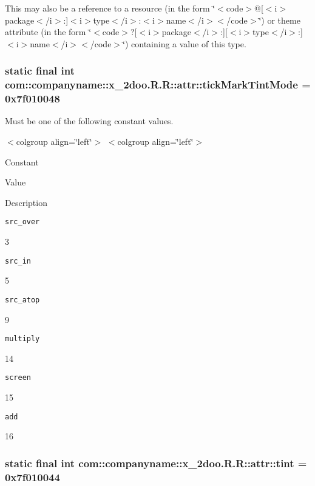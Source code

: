 This may also be a reference to a resource (in the form \char`\"{}$<$code$>$@\mbox{[}$<$i$>$package$<$/i$>$:\mbox{]}$<$i$>$type$<$/i$>$:$<$i$>$name$<$/i$>$$<$/code$>$\char`\"{}) or theme attribute (in the form \char`\"{}$<$code$>$?\mbox{[}$<$i$>$package$<$/i$>$:\mbox{]}\mbox{[}$<$i$>$type$<$/i$>$:\mbox{]}$<$i$>$name$<$/i$>$$<$/code$>$\char`\"{}) containing a value of this type. \hypertarget{classcom_1_1companyname_1_1x__2doo_1_1_r_1_1attr_dbe326d1dc87f4553866734cdb38566f}{
\subsubsection[{tickMarkTintMode}]{\setlength{\rightskip}{0pt plus 5cm}static final int com::companyname::x\_\-2doo.R.R::attr::tickMarkTintMode = 0x7f010048}}
\label{classcom_1_1companyname_1_1x__2doo_1_1_r_1_1attr_dbe326d1dc87f4553866734cdb38566f}


Must be one of the following constant values. \begin{TabularC}{0}
\hline
\end{TabularC}
$<$colgroup align=\char`\"{}left\char`\"{}$>$ $<$colgroup align=\char`\"{}left\char`\"{}$>$ 

Constant

Value

Description 

{\tt src\_\-over}

3

{\tt src\_\-in}

5

{\tt src\_\-atop}

9

{\tt multiply}

14

{\tt screen}

15

{\tt add}

16\hypertarget{classcom_1_1companyname_1_1x__2doo_1_1_r_1_1attr_80a740d9824a3b6ca2a2cd6aa7e45000}{
\subsubsection[{tint}]{\setlength{\rightskip}{0pt plus 5cm}static final int com::companyname::x\_\-2doo.R.R::attr::tint = 0x7f010044}}
\label{classcom_1_1companyname_1_1x__2doo_1_1_r_1_1attr_80a740d9824a3b6ca2a2cd6aa7e45000}


